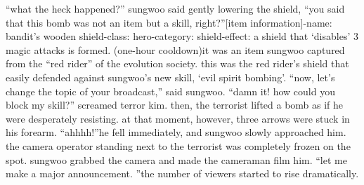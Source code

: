 “what the heck happened?” sungwoo said gently lowering the shield, “you said that this bomb was not an item but a skill, right?”[item information]-name: bandit’s wooden shield-class: hero-category: shield-effect: a shield that ‘disables’ 3 magic attacks is formed.
 (one-hour cooldown)it was an item sungwoo captured from the “red rider” of the evolution society.
this was the red rider’s shield that easily defended against sungwoo’s new skill, ‘evil spirit bombing’.
“now, let’s change the topic of your broadcast,” said sungwoo.
“damn it! how could you block my skill?” screamed terror kim.
then, the terrorist lifted a bomb as if he were desperately resisting.
at that moment, however, three arrows were stuck in his forearm.
“ahhhh!”he fell immediately, and sungwoo slowly approached him.
the camera operator standing next to the terrorist was completely frozen on the spot.
sungwoo grabbed the camera and made the cameraman film him.
“let me make a major announcement.
”the number of viewers started to rise dramatically.


 